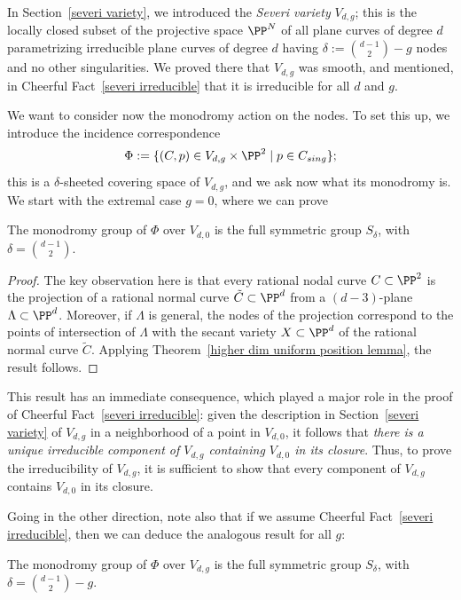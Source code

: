 In Section~\ref{severi variety}, we introduced the \emph{Severi variety} $V_{d,g}$; this is the locally closed subset of the projective space $\PP^N$ of all plane curves of degree $d$ parametrizing irreducible plane curves of degree $d$ having $\delta := \binom{d-1}{2} - g$ nodes and no other singularities. We proved there that $V_{d,g}$ was smooth, and mentioned, in Cheerful Fact~\ref{severi irreducible} that it is irreducible for all $d$ and $g$. 

We want to consider now the monodromy action on the nodes. To set this up, we introduce the incidence correspondence
$$
\Phi := \{(C, p) \in V_{d,g} \times \PP^2 \mid p \in C_{sing} \};
$$ 
this is a $\delta$-sheeted covering space of $V_{d,g}$, and we ask now what its monodromy is. We start with the extremal case $g = 0$, where we can prove

\begin{proposition}
The monodromy group of $\Phi$ over $V_{d,0}$ is the full symmetric group $S_\delta$, with $\delta = \binom{d-1}{2}$.
\end{proposition}

\begin{proof}
The key observation here is that every rational nodal curve $C \subset \PP^2$ is the projection of a rational normal curve $\tilde C \subset \PP^d$ from a $(d-3)$-plane $\Lambda \subset \PP^d$. Moreover, if $\Lambda$ is general,  the nodes of the projection correspond to the points of intersection of $\Lambda$ with the  secant variety $X \subset \PP^d$ of the rational normal curve $\tilde C$. Applying Theorem~\ref{higher dim uniform position lemma}, the result follows.
\end{proof}

This result has an immediate consequence, which played a major role in the proof of Cheerful Fact~\ref{severi irreducible}: given the description in Section~\ref{severi variety} of $V_{d,g}$ in a neighborhood of a point in $V_{d,0}$, it follows that \emph{there is a unique irreducible component of $V_{d,g}$ containing $V_{d,0}$ in its closure}. Thus, to prove the irreducibility of $V_{d,g}$, it is sufficient to show that every component of $V_{d,g}$ contains $V_{d,0}$ in its closure. 

Going in the other direction, note also that if we assume Cheerful Fact~\ref{severi irreducible}, then we can deduce the analogous result for all $g$:


\begin{proposition}
The monodromy group of $\Phi$ over $V_{d,g}$ is the full symmetric group $S_\delta$, with $\delta = \binom{d-1}{2} - g$.
\end{proposition}



